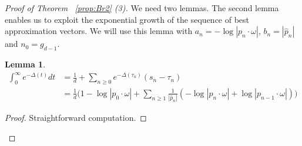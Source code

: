 \documentclass[12pt,reqno,a4paper]{amsart}%
\numberwithin{equation}{section}
\newtheorem{lemma}[theorem]{Lemma}
\begin{document}
\begin{proof}[Proof of Theorem~ \ref{prop:Br2} (3)]
	We need two lemmas. The second lemma enables us to exploit the exponential growth of the sequence of best approximation vectors. We will use this  lemma with $a_n=-\log|p_n\cdot\omega|$, $b_n=|\hat p_n|$ and $n_0=g_{d-1}$.
	 

\begin{lemma}\label{formula:integralDelta}
	\begin{align*}
	\int_{0}^{\infty}e^{-\Delta(t)}dt&=\frac1{d}+\sum_{n\geq 0}e^{-\Delta(\tau_n)}(s_n-\tau_n)\\
	&=\frac1{d}\big(1-\log|p_0\cdot\omega|+\sum_{n\geq 1}\frac1{|\hat p_n|} (-\log|p_n\cdot\omega|+\log |p_{n-1}\cdot\omega|)\big)
	\end{align*}
\end{lemma}
\begin{proof}
	Straightforward computation.
\end{proof}


\end{proof}
\end{document}
